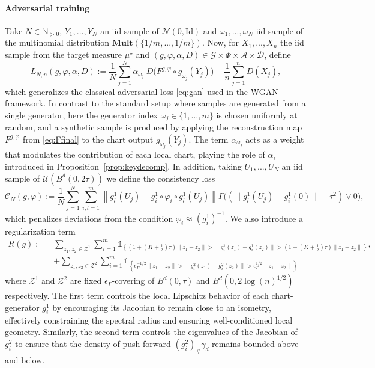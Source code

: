 \documentclass[10pt]{article}
\begin{document}
\paragraph{Adversarial training} Take $N\in \mathbb{N}_{>0}$, $Y_1,...,Y_N$ an iid sample of  $\mathcal{N}(0,\text{Id})$  and $\omega_1,...,\omega_N$ iid sample of the multinomial distribution $\textbf{Mult}(\{1/m,...,1/m\})$. Now,
 for $X_1,...,X_n$ the iid sample from the target measure $\mu^\star$ and $(g,\varphi,\alpha,D)\in \mathcal{G}\times \Phi \times \mathcal{A}\times \mathcal{D}$,
define
\begin{equation}\label{eq:Ln}
    L_{N,n}(g,\varphi,\alpha,D):=\frac{1}{N} \sum_{j=1}^N \alpha_{\omega_j}\  D\Big(F^{g,\varphi}\circ g_{\omega_j}(Y_j)\Big)-\frac{1}{n} \sum_{j=1}^n D(X_j),
\end{equation}
which generalizes the classical adversarial loss \eqref{eq:gan} used in the WGAN framework. In contrast to the standard setup where samples are generated from a single generator, here the generator index \( \omega_j \in \{1, \dots, m\} \) is chosen uniformly at random, and a synthetic sample is produced by applying the reconstruction map \( F^{g, \varphi} \) from \eqref{eq:Ffinal} to the chart output \( g_{\omega_j}(Y_j) \).
The term \( \alpha_{\omega_j} \) acts as a weight that modulates the contribution of each local chart, playing the role of \( \alpha_i \) introduced in Proposition~\ref{prop:keydecomp}.
In addition, taking $U_1,...,U_N$ an iid sample of $\mathcal{U}(B^d(0,2\tau))$ we define the consistency loss
\begin{equation}\label{eq:Cn}
    \mathcal{C}_N(g, \varphi) := \frac{1}{N} \sum_{j=1}^N \sum_{i,l=1}^m \left\| g_l^1(U_j) - g_i^1\circ \varphi_i \circ g_l^1(U_j) \right\|  \Gamma\big((\|g_l^1(U_j) - g_i^1(0)\|-\tau^2)\vee 0\big),
\end{equation}
which penalizes deviations from the condition \( \varphi_i \approx (g_i^1)^{-1} \).
We also introduce a regularization term
\begin{align}\label{eq:R}
    R(g) := &\sum_{z_1, z_2 \in \mathcal{Z}^1} \sum_{i=1}^m 
    \mathds{1}_{\left\{ 
        (1 + (K + \tfrac{1}{2})\tau) \|z_1 - z_2\| > \|g_i^1(z_1) - g_i^1(z_2)\| > 
        (1 - (K + \tfrac{1}{2})\tau) \|z_1 - z_2\| 
    \right\}},\\\nonumber
   & + \sum_{z_1, z_2 \in \mathcal{Z}^2} \sum_{i=1}^m 
    \mathds{1}_{\left\{\epsilon_\Gamma^{-1/2} \|z_1 - z_2\|> \|g_i^2(z_1) - g_i^2(z_2)\| > 
        \epsilon_\Gamma^{1/2} \|z_1 - z_2\| 
    \right\}}
\end{align}
where \( \mathcal{Z}^1 \) and \( \mathcal{Z}^2 \) are fixed \( \epsilon_\Gamma \)-covering of \( B^d(0, \tau) \) and \( B^d(0, 2\log(n)^{1/2}) \) respectively. The first term controls the local Lipschitz behavior of each chart-generator \( g_i^1 \) by encouraging its Jacobian to remain close to an isometry, effectively constraining the spectral radius and ensuring well-conditioned local geometry. Similarly, the second term controls the eigenvalues of the Jacobian of \( g_i^2 \) to ensure that the density of push-forward  $(g_i^2)_{\#}\gamma_d$ remains bounded above and below.
\end{document}
